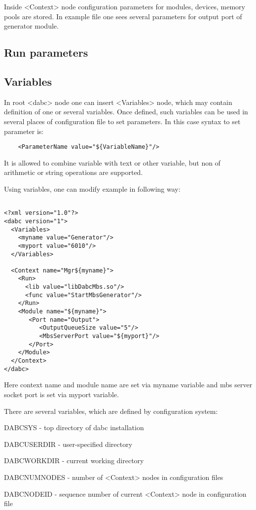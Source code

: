 Inside <Context> node configuration parameters for modules, devices, memory pools are stored.
In example file one sees several parameters for output port of generator module.  

\subsection{Run parameters}


\subsection{Variables}

In root <dabc> node one can insert <Variables> node, which may contain 
definition of one or several variables. Once defined, 
such variables can be used in several places of configuration file to set parameters.
In this case syntax to set parameter is:

\begin{verbatim}
    <ParameterName value="${VariableName}"/>
\end{verbatim}

It is allowed to combine variable with text or other variable, 
but non of arithmetic or string operations are supported. 

Using variables, one can modify example in following way:

\begin{verbatim}

<?xml version="1.0"?>
<dabc version="1">
  <Variables>
    <myname value="Generator"/> 
    <myport value="6010"/> 
  </Variables>

  <Context name="Mgr${myname}">
    <Run>
      <lib value="libDabcMbs.so"/>
      <func value="StartMbsGenerator"/>
    </Run>
    <Module name="${myname}">
       <Port name="Output">
          <OutputQueueSize value="5"/>
          <MbsServerPort value="${myport}"/>
       </Port>
    </Module>
  </Context>
</dabc>

\end{verbatim}

Here context name and module name are set via myname variable and mbs server 
socket port is set via myport variable.

There are several variables, which are defined by configuration system:

\bbul
\item DABCSYS - top directory of dabc installation
\item DABCUSERDIR - user-specified directory
\item DABCWORKDIR - current working directory
\item DABCNUMNODES - number of <Context> nodes in configuration files
\item DABCNODEID - sequence number of current <Context> node in configuration file 
\ebul

